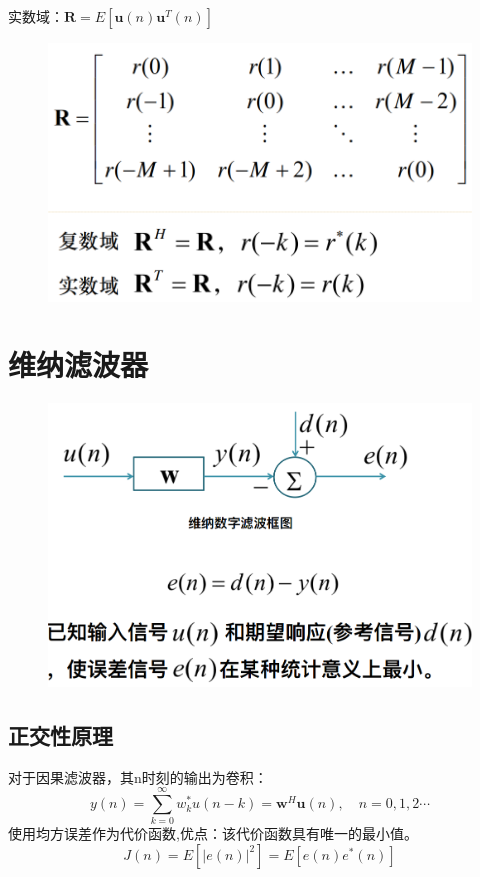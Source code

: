 \documentclass[UTF8]{ctexart} %
\begin{document}
				实数域：$\textbf{R}=E[\textbf{u}(n)\textbf{u}^T(n)]$
				
				\begin{figure}[H]
					\centering\includegraphics[scale=0.3]{8.png}
				\end{figure}
				
	\section{维纳滤波器}
		\begin{figure}[H]
			\centering\includegraphics[scale=0.3]{9.png}
		\end{figure}
		\subsection{正交性原理}
		
			对于因果滤波器，其n时刻的输出为卷积：
			\[y(n) = \sum_{k=0}^\infty w_k^*u(n-k) = \textbf{w}^H\textbf{u}(n),\quad n=0,1,2\cdots\]
			使用均方误差作为代价函数,优点：该代价函数具有唯⼀的最⼩值。
			\[J(n) = E[|e(n)|^2]=E[e(n)e^*(n)]\] 
			
\end{document}
